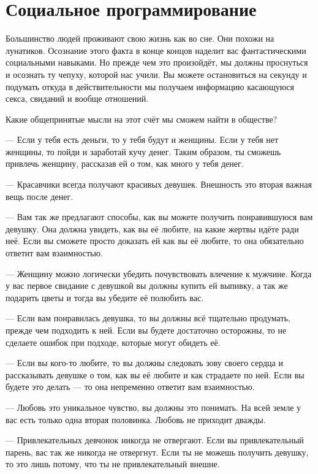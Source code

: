 
\chapter{Социальное программирование}

Большинство людей проживают свою жизнь как во сне. Они похожи на лунатиков. Осознание этого факта в конце концов наделит вас фантастическими социальными навыками. Но прежде чем это произойдёт, мы должны проснуться и осознать ту чепуху, которой нас учили. Вы можете остановиться на секунду и подумать откуда в действительности мы получаем информацию касающуюся секса, свиданий и вообще отношений.

Какие общепринятые мысли на этот счёт мы сможем найти в обществе?

--- Если у тебя есть деньги, то у тебя будут и женщины. Если у тебя нет женщины, то пойди и заработай кучу денег. Таким образом, ты сможешь привлечь женщину, рассказав ей о том, как много у тебя денег.

--- Красавчики всегда получают красивых девушек. Внешность это вторая важная вещь после денег.

--- Вам так же предлагают способы, как вы можете получить понравившуюся вам девушку. Она должна увидеть, как вы её любите, на какие жертвы идёте ради неё. Если вы сможете просто доказать ей как вы её любите, то она обязательно ответит вам взаимностью.

--- Женщину можно логически убедить почувствовать влечение к мужчине. Когда у вас первое свидание с девушкой вы должны купить ей выпивку, а так же подарить цветы и тогда вы убедите её полюбить вас.

--- Если вам понравилась девушка, то вы должны всё тщательно продумать, прежде чем подходить к ней. Если вы будете достаточно осторожны, то не сделаете ошибок при подходе, которые могут обидеть её.

--- Если вы кого-то любите, то вы должны следовать зову своего сердца и рассказывать девушке о том, как вы её любите и как страдаете по ней. Если вы будете это делать --- то она непременно ответит вам взаимностью.

--- Любовь это уникальное чувство, вы должны это понимать. На всей земле у вас есть только одна вторая половинка. Любовь не приходит дважды.

--- Привлекательных девчонок никогда не отвергают. Если вы привлекательный парень, вас так же никогда не отвергнут. Если ты не можешь получить девушку, то это лишь потому, что ты не привлекательный внешне.

